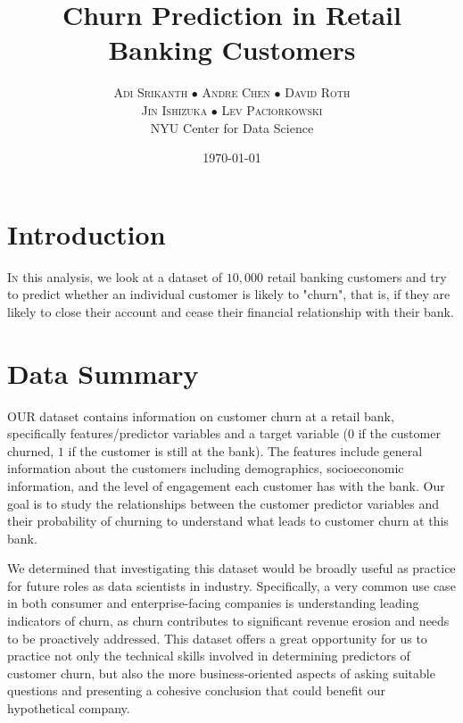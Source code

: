 \documentclass[twoside,twocolumn]{article}
\title{Churn Prediction in Retail Banking Customers} %
\author{%
\textsc{Adi Srikanth $\bullet$ Andre Chen $\bullet$ David Roth} \\[1ex] %
\textsc{Jin Ishizuka $\bullet$ Lev Paciorkowski} \\[1ex] %
\normalsize NYU Center for Data Science \\ %
}
\date{\today} %
\begin{document}
\maketitle

\section{Introduction}

\lettrine[nindent=0em,lines=2]{I} n this analysis, we look at a dataset of $10,000$ retail banking customers and try to predict whether an individual customer is likely to "churn", that is, if they are likely to close their account and cease their financial relationship with their bank.

\section{Data Summary}

\lettrine[nindent=0em,lines=2]{O}UR dataset contains information on customer churn at a retail bank, specifically features/predictor variables and a target variable ($0$ if the customer churned, $1$ if the customer is still at the bank). The features include general information about the customers including demographics, socioeconomic information, and the level of engagement each customer has with the bank. Our goal is to study the relationships between the customer predictor variables and their probability of churning to understand what leads to customer churn at this bank.
    
We determined that investigating this dataset would be broadly useful as practice for future roles as data scientists in industry. Specifically, a very common use case in both consumer and enterprise-facing companies is understanding leading indicators of churn, as churn contributes to significant revenue erosion and needs to be proactively addressed. This dataset offers a great opportunity for us to practice not only the technical skills involved in determining predictors of customer churn, but also the more business-oriented aspects of asking suitable questions and presenting a cohesive conclusion that could benefit our hypothetical company.
\end{document}
